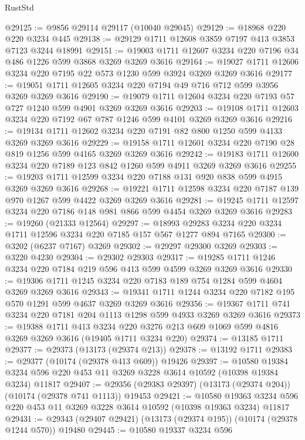 \begin{lexlean}{RustStd}
\begin{coremodule}
@29125 := @9856 @29114 @29117 (@10040 @29045)
@29129 := @18968 @220 @220 @3234 @445
@29138 := @29129 @1711 @12608 @3859 @7197 @413 @3853 @7123 @3244 @18991
@29151 := @19003 @1711 @12607 @3234 @220 @7196 @34 @486 @1226 @599 @3868 @3269 @3269 @3616
@29164 := @19027 @1711 @12606 @3234 @220 @7195 @22 @573 @1230 @599 @3924 @3269 @3269 @3616
@29177 := @19051 @1711 @12605 @3234 @220 @7194 @49 @716 @712 @599 @3956 @3269 @3269 @3616
@29190 := @19079 @1711 @12604 @3234 @220 @7193 @57 @727 @1240 @599 @4901 @3269 @3269 @3616
@29203 := @19108 @1711 @12603 @3234 @220 @7192 @67 @787 @1246 @599 @4101 @3269 @3269 @3616
@29216 := @19134 @1711 @12602 @3234 @220 @7191 @82 @800 @1250 @599 @4133 @3269 @3269 @3616
@29229 := @19158 @1711 @12601 @3234 @220 @7190 @28 @819 @1256 @599 @4165 @3269 @3269 @3616
@29242 := @19183 @1711 @12600 @3234 @220 @7189 @123 @842 @1260 @599 @4911 @3269 @3269 @3616
@29255 := @19203 @1711 @12599 @3234 @220 @7188 @131 @920 @838 @599 @4915 @3269 @3269 @3616
@29268 := @19221 @1711 @12598 @3234 @220 @7187 @139 @970 @1267 @599 @4422 @3269 @3269 @3616
@29281 := @19245 @1711 @12597 @3234 @220 @7186 @148 @981 @866 @599 @4454 @3269 @3269 @3616
@29283 := @19260 (@21333 @12564)
@29297 := @18993 @29283 @3234 @220 @3234 @1711 @12596 @3234 @220 @7185 @157 @567 @1277 @894 @7165
@29300 := @3202 (@6237 @7167) @3269
@29302 := @29297 @29300 @3269
@29303 := @3220 @4230
@29304 := @29302 @29303
@29317 := @19285 @1711 @1246 @3234 @220 @7184 @219 @596 @413 @599 @4599 @3269 @3269 @3616
@29330 := @19306 @1711 @1245 @3234 @220 @7183 @189 @754 @1284 @599 @4604 @3269 @3269 @3616
@29343 := @19341 @1711 @1244 @3234 @220 @7182 @195 @570 @1291 @599 @4637 @3269 @3269 @3616
@29356 := @19367 @1711 @741 @3234 @220 @7181 @204 @1113 @1298 @599 @4933 @3269 @3269 @3616
@29373 := @19388
    @1711
    @413
    @3234
    @220
    @3276
    @213
    @609
    @1069
    @599
    @4816
    @3269
    @3269
    @3616
    (@19405 @1711 @3234 @220)
@29374 := @13185 @1711
@29377 := @29373 (@13173 (@29374 @213))
@29378 := @13192 @1711
@29383 := @29377 (@10174 (@29378 @413 @609)) @19426
@29397 := @10580
    @19384
    @3234
    @596
    @220
    @453
    @11
    @3269
    @3228
    @3614
    @10592
    (@10398 @19384 @3234)
    @11817
@29407 := @29356 (@29383 @29397) (@13173 (@29374 @204)) (@10174 (@29378 @741 @1113)) @19453
@29421 := @10580
    @19363
    @3234
    @596
    @220
    @453
    @11
    @3269
    @3228
    @3614
    @10592
    (@10398 @19363 @3234)
    @11817
@29431 := @29343 (@29407 @29421) (@13173 (@29374 @195)) (@10174 (@29378 @1244 @570)) @19480
@29445 := @10580
    @19337
    @3234
    @596

\end{coremodule}
\end{lexlean}

